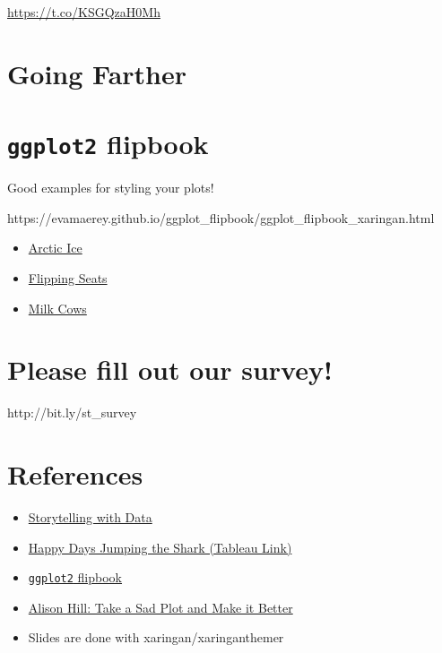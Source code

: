 \documentclass[
  letterpaper,
  DIV=11,
  numbers=noendperiod]{scrreprt}
\providecommand{\tightlist}{%
  \setlength{\itemsep}{0pt}\setlength{\parskip}{0pt}}\usepackage{longtable,booktabs,array}
\begin{document}
\url{https://t.co/KSGQzaH0Mh}

\section*{Going Farther}\label{going-farther}


\section*{\texorpdfstring{\texttt{ggplot2}
flipbook}{ggplot2 flipbook}}\label{ggplot2-flipbook}


Good examples for styling your plots!

https://evamaerey.github.io/ggplot\_flipbook/ggplot\_flipbook\_xaringan.html

\begin{itemize}
\tightlist
\item
  \href{https://evamaerey.github.io/ggplot_flipbook/ggplot_flipbook_xaringan.html\#226}{Arctic
  Ice}
\item
  \href{https://evamaerey.github.io/ggplot_flipbook/ggplot_flipbook_xaringan.html\#302}{Flipping
  Seats}
\item
  \href{https://evamaerey.github.io/ggplot_flipbook/ggplot_flipbook_xaringan.html\#354}{Milk
  Cows}
\end{itemize}

\section*{Please fill out our survey!}\label{please-fill-out-our-survey}


http://bit.ly/st\_survey

\section*{References}\label{references}


\begin{itemize}
\tightlist
\item
  \href{http://www.storytellingwithdata.com/books}{Storytelling with
  Data}
\item
  \href{https://t.co/KSGQzaH0Mh}{Happy Days Jumping the Shark (Tableau
  Link)}
\item
  \href{https://evamaerey.github.io/ggplot_flipbook/ggplot_flipbook_xaringan.html}{\texttt{ggplot2}
  flipbook}
\item
  \href{https://alison.rbind.io/talk/2018-ohsu-sad-plot-better/}{Alison
  Hill: Take a Sad Plot and Make it Better}
\item
  Slides are done with xaringan/xaringanthemer
\end{itemize}
\end{document}

